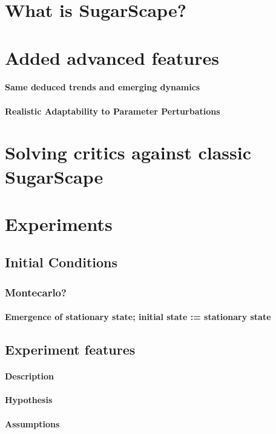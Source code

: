 \documentclass{report}
\begin{document}
	\section{What is SugarScape?}
	\section{Added advanced features}
		\paragraph{Same deduced trends and emerging dynamics}
		\paragraph{Realistic Adaptability to Parameter Perturbations}
	\section{Solving critics against classic SugarScape}
	\section{Experiments}	
		\subsection{Initial Conditions}
			\subsubsection{Montecarlo?} 
			\paragraph{Emergence of stationary state; initial state := stationary state}
		\subsection{Experiment features}
			\paragraph{Description}
			\paragraph{Hypothesis}
			\paragraph{Assumptions}
\end{document}
